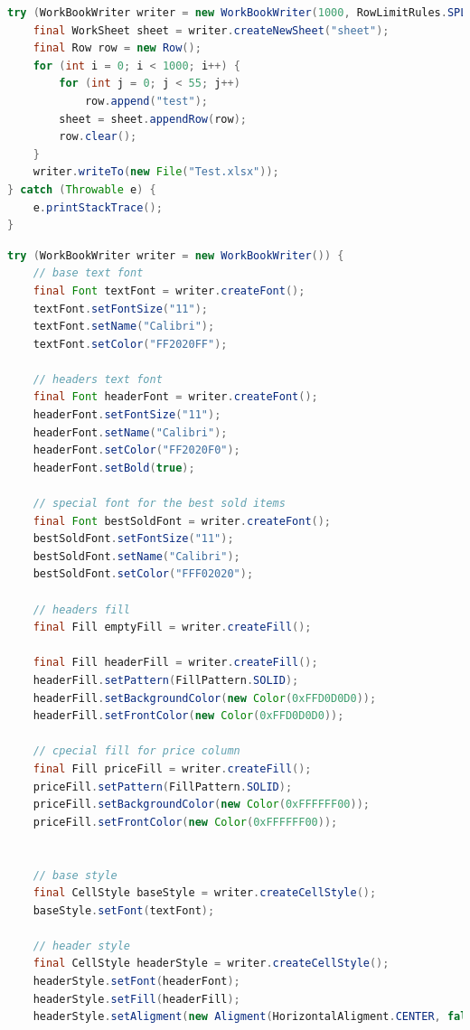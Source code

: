 \documentclass[14pt]{matmex-diploma-custom}
\begin{document}
\begin{lstlisting}[language=Java, style=basic, caption={Пример создания простого документа XLSX с помощью библиотеки oxml-doc}, captionpos=b, label=java1]
try (WorkBookWriter writer = new WorkBookWriter(1000, RowLimitRules.SPLIT)) {
    final WorkSheet sheet = writer.createNewSheet("sheet");
    final Row row = new Row();
    for (int i = 0; i < 1000; i++) {
        for (int j = 0; j < 55; j++)
            row.append("test");
        sheet = sheet.appendRow(row);
        row.clear();
    }
    writer.writeTo(new File("Test.xlsx"));
} catch (Throwable e) {
    e.printStackTrace();
}
\end{lstlisting}

\begin{lstlisting}[language=Java, style=basic, caption={Пример создания документа XLSX с форматированием с помощью библиотеки oxml-doc}, captionpos=b, label=java2]
try (WorkBookWriter writer = new WorkBookWriter()) {
    // base text font
    final Font textFont = writer.createFont();
    textFont.setFontSize("11");
    textFont.setName("Calibri");
    textFont.setColor("FF2020FF");

    // headers text font
    final Font headerFont = writer.createFont();
    headerFont.setFontSize("11");
    headerFont.setName("Calibri");
    headerFont.setColor("FF2020F0");
    headerFont.setBold(true);

    // special font for the best sold items
    final Font bestSoldFont = writer.createFont();
    bestSoldFont.setFontSize("11");
    bestSoldFont.setName("Calibri");
    bestSoldFont.setColor("FFF02020");

    // headers fill
    final Fill emptyFill = writer.createFill();

    final Fill headerFill = writer.createFill();
    headerFill.setPattern(FillPattern.SOLID);
    headerFill.setBackgroundColor(new Color(0xFFD0D0D0));
    headerFill.setFrontColor(new Color(0xFFD0D0D0));

    // cpecial fill for price column
    final Fill priceFill = writer.createFill();
    priceFill.setPattern(FillPattern.SOLID);
    priceFill.setBackgroundColor(new Color(0xFFFFFF00));
    priceFill.setFrontColor(new Color(0xFFFFFF00));


    // base style
    final CellStyle baseStyle = writer.createCellStyle();
    baseStyle.setFont(textFont);

    // header style
    final CellStyle headerStyle = writer.createCellStyle();
    headerStyle.setFont(headerFont);
    headerStyle.setFill(headerFill);
    headerStyle.setAligment(new Aligment(HorizontalAligment.CENTER, false, VerticalAligment.CENTER));


\end{lstlisting}
\end{document}
